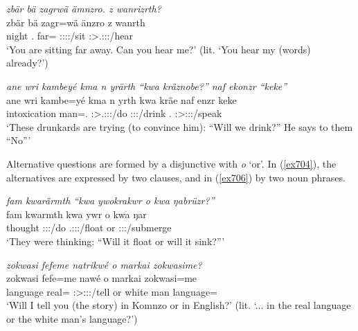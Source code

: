 \begin{exe}
	\ex \emph{zbär bä zagrwä ämnzro. z wanrizrth?}\\
	\gll zbär bä zagr=wä änzro z wanrth\\
	night \Second.{\Abs} far={\Emph} \Stpl:\Sbj:\Nonpast:\Ipfv:\Andat/sit {\Iam} \Stpl:\Sbj>\Fsg.\Io:\Nonpast:\Ipfv:\Venit/hear\\
	\trans `You are sitting far away. Can you hear me?' (lit. `You hear my (words) already?')\\
	\label{ex702}
\end{exe}
\begin{exe}
	\ex \emph{ane wri kambeyé kma n yrärth ``kwa kräznobe?'' naf ekonzr ``keke''}\\
	\gll ane wri kambe=yé kma n yrth kwa kräe naf enzr keke\\
	{\Dem} intoxication man=\Erg.{\Nsg} {\Pot} {\Imn} \Stpl:\Sbj>\Tsg.\Masc:\Obj:\Nonpast:\Ipfv/do {\Fut} \Fpl:\Sbj:\Irr:\Pfv/drink \Tsg.{\Erg} \Stsg:\Sbj>\Stpl:\Obj:\Nonpast:\Ipfv/speak \Neg\\
	\trans `These drunkards are trying (to convince him): ``Will we drink?'' He says to them ``No'''
	\label{ex703}
\end{exe}

Alternative questions are formed by a disjunctive  with \emph{o} `or'. In (\ref{ex704}), the alternatives are expressed by two clauses, and in (\ref{ex706}) by two noun phrases.

\begin{exe}
	\ex \emph{fam kwarärmth ``kwa ywokrakwr o kwa ŋabrüzr?''}\\
	\gll fam kwarmth kwa ywr o kwa ŋar\\
	thought \Stpl:\Sbj:\Pst:\Dur/do {\Fut} \Tsg.\Masc:\Sbj:\Nonpast:\Ipfv/float or {\Fut} \Stsg:\Sbj:\Nonpast:\Ipfv/submerge\\
	\trans `They were thinking: ``Will it float or will it sink?'''
	\label{ex704}
\end{exe}
\begin{exe}
	\ex \emph{zokwasi fefeme natrikwé o markai zokwasime?}\\
	\gll zokwasi fefe=me nawé o markai zokwasi=me\\
	language real={\Ins} \Fsg:\Sbj>\Ssg:\Io:\Nonpast:\Ipfv/tell or {white man} language=\Ins\\
	\trans `Will I tell you (the story) in Komnzo or in English?' (lit. `... in the real language or the white man's language?')
	\label{ex706}
\end{exe}

